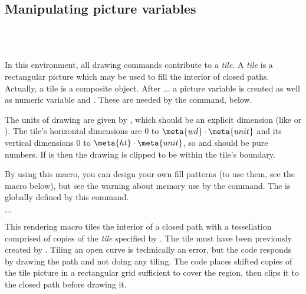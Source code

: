 \documentclass[letterpaper]{article}
\begin{document}
\subsection{Manipulating \MF{} picture variables}

\begin{cd}
\\
  \ \\
%
%
\end{cd}

In this environment, all drawing commands contribute to a \emph{tile}. A
\emph{tile} is a rectangular picture which may be used to fill the
interior of closed paths. Actually, a tile is a composite object. After
 $\ldots$  a picture variable
 is created as well as numeric variable  and
. These are needed by the  command, below.

The units of drawing are given by , which should be an
explicit dimension (like \dim{1pt} or \dim{.2in}). The tile's horizontal
dimensions are $0$ to $\meta{wd}\cdot\meta{unit}$ and its vertical
dimensions $0$ to $\meta{ht}\cdot\meta{unit}$, so  and
 should be pure numbers. If  is  then the
drawing is clipped to be within the tile's boundary.

By using this macro, you can design your own fill patterns (to use them,
see the  macro below), but see the warning about memory use by
the  command. The  is globally defined by this
command.

\begin{cd}
$\ldots$%
\end{cd}

This rendering macro tiles the interior of a closed path with a
tessellation comprised of copies of the \emph{tile} specified by
. The tile must have been previously created by
. Tiling an open curve is
technically an error, but the \MF{} code responds by drawing the path
and not doing any tiling. The \MF{} code places shifted copies of the
tile picture in a rectangular grid sufficient to cover the region, then
clips it to the closed path before drawing it.
\end{document}
